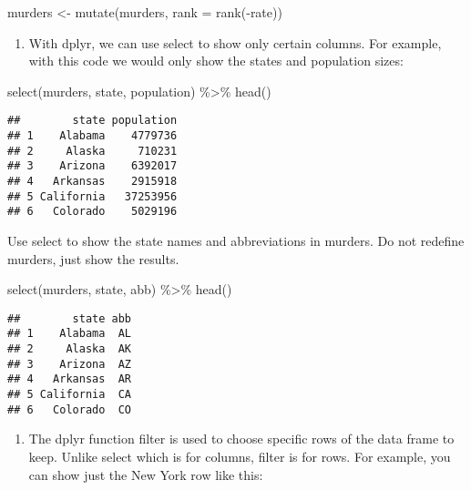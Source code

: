 \documentclass[
]{article}
\newenvironment{Shaded}{\begin{snugshade}}{\end{snugshade}}
\newcommand{\AttributeTok}[1]{\textcolor[rgb]{0.77,0.63,0.00}{#1}}
\newcommand{\FunctionTok}[1]{\textcolor[rgb]{0.00,0.00,0.00}{#1}}
\newcommand{\NormalTok}[1]{#1}
\newcommand{\OtherTok}[1]{\textcolor[rgb]{0.56,0.35,0.01}{#1}}
\newcommand{\SpecialCharTok}[1]{\textcolor[rgb]{0.00,0.00,0.00}{#1}}
\providecommand{\tightlist}{%
  \setlength{\itemsep}{0pt}\setlength{\parskip}{0pt}}
\begin{document}
\begin{Shaded}
\begin{Highlighting}[]
\NormalTok{murders }\OtherTok{\textless{}{-}} \FunctionTok{mutate}\NormalTok{(murders, }\AttributeTok{rank =} \FunctionTok{rank}\NormalTok{(}\SpecialCharTok{{-}}\NormalTok{rate))}
\end{Highlighting}
\end{Shaded}

\begin{enumerate}
\def\labelenumi{\arabic{enumi}.}
\setcounter{enumi}{2}
\tightlist
\item
  With dplyr, we can use select to show only certain columns. For
  example, with this code we would only show the states and population
  sizes:
\end{enumerate}

\begin{Shaded}
\begin{Highlighting}[]
\FunctionTok{select}\NormalTok{(murders, state, population) }\SpecialCharTok{\%\textgreater{}\%} \FunctionTok{head}\NormalTok{()}
\end{Highlighting}
\end{Shaded}

\begin{verbatim}
##        state population
## 1    Alabama    4779736
## 2     Alaska     710231
## 3    Arizona    6392017
## 4   Arkansas    2915918
## 5 California   37253956
## 6   Colorado    5029196
\end{verbatim}

Use select to show the state names and abbreviations in murders. Do not
redefine murders, just show the results.

\begin{Shaded}
\begin{Highlighting}[]
\FunctionTok{select}\NormalTok{(murders, state, abb) }\SpecialCharTok{\%\textgreater{}\%} \FunctionTok{head}\NormalTok{()}
\end{Highlighting}
\end{Shaded}

\begin{verbatim}
##        state abb
## 1    Alabama  AL
## 2     Alaska  AK
## 3    Arizona  AZ
## 4   Arkansas  AR
## 5 California  CA
## 6   Colorado  CO
\end{verbatim}

\begin{enumerate}
\def\labelenumi{\arabic{enumi}.}
\setcounter{enumi}{3}
\tightlist
\item
  The dplyr function filter is used to choose specific rows of the data
  frame to keep. Unlike select which is for columns, filter is for rows.
  For example, you can show just the New York row like this:
\end{enumerate}
\end{document}
